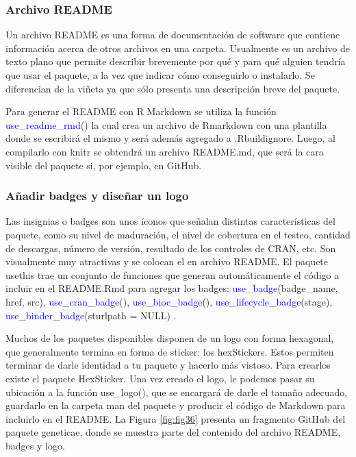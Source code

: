 \subsubsection{Archivo README}

Un archivo README es una forma de documentación de software que contiene información acerca de otros archivos en una carpeta. Usualmente es un archivo de texto plano que permite describir brevemente por qué y para qué alguien tendría que usar el paquete, a la vez que indicar cómo conseguirlo o instalarlo. Se diferencian de la viñeta ya que sólo presenta una descripción breve del paquete.


Para generar el README con R Markdown se utiliza la función \textcolor{blue}{use\_readme\_rmd}() la cual crea un archivo de Rmarkdown con una plantilla donde se escribirá el mismo y será además agregado a .Rbuildignore. Luego, al compilarlo con knitr se obtendrá un archivo README.md, que será la cara visible del paquete si, por ejemplo, en GitHub.

\subsubsection{Añadir badges y diseñar un logo}

Las insignias o badges son unos íconos que señalan distintas características del paquete, como su nivel de maduración, el nivel de cobertura en el testeo, cantidad de descargas, número de versión, resultado de los controles de CRAN, etc.
Son visualmente muy atractivas y se colocan el en archivo README.     El paquete usethis trae un conjunto de funciones que generan automáticamente el código a incluir en el README.Rmd para agregar los badges: \textcolor{blue}{use\_badge}(badge\_name, href, src), \textcolor{blue}{use\_cran\_badge}(), \textcolor{blue}{use\_bioc\_badge}(), \textcolor{blue}{use\_lifecycle\_badge}(stage), 
\textcolor{blue}{use\_binder\_badge}(sturlpath = NULL) .


Muchos de los paquetes disponibles disponen de un logo con forma hexagonal, que generalmente termina en forma de sticker: los hexStickers. Estos permiten terminar de darle identidad a tu paquete y hacerlo más vistoso. Para crearlos existe el paquete HexSticker. Una vez creado el logo, le podemos pasar su ubicación a la función use\_logo(), que se encargará de darle el tamaño adecuado, guardarlo en la carpeta man del paquete y producir el código de Markdown para incluirlo en el README. 
La Figura \ref{fig:fig36} presenta un fragmento GitHub del paquete geneticae, donde se muestra parte del contenido del archivo README, badges y logo.

